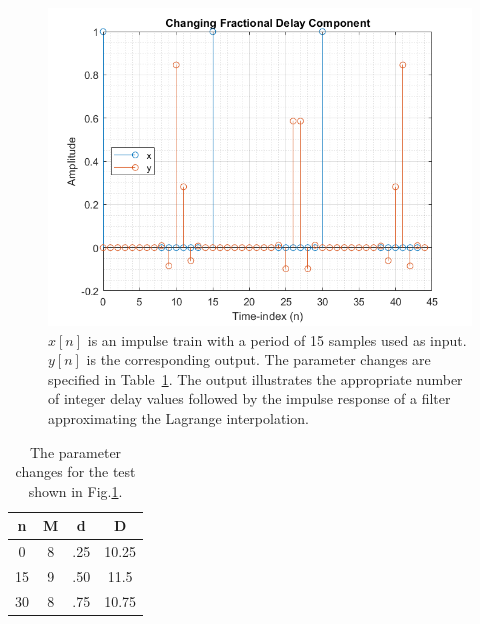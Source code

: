 \documentclass[../main.tex]{subfiles}
\begin{document}
\begin{figure}[h!]
    \centering
    \includegraphics[scale=.65]{./images/plots/LagrangeTest3.png}
    \caption{$x[n]$ is an impulse train with a period of 15 samples used as input. $y[n]$ is the corresponding output. The parameter changes are specified in Table~\ref{tab:LagrangeTest3}. The output illustrates the appropriate number of integer delay values followed by the impulse response of a filter approximating the Lagrange interpolation.}
    \label{fig:LagrangeTest3}
\end{figure}

\begin{table}[h!]
    \centering
     \begin{tabular}{||c| |c |c |c|} 
         \hline
         \textbf{n} & \textbf{M} & \textbf{d} & \textbf{D} \\ [0.5ex] 
         \hline
         0 & 8 & .25 & 10.25 \\ 
         \hline
         15 & 9 & .50 & 11.5 \\
         \hline
         30 & 8 & .75 & 10.75 \\
         \hline
    \end{tabular}
    \caption{The parameter changes for the test shown in Fig.\ref{fig:LagrangeTest3}.}
    \label{tab:LagrangeTest3}
\end{table}
\end{document}
